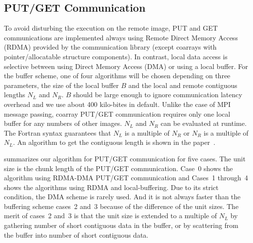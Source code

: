 \subsection{PUT/GET Communication}\label{sec:putget}

To avoid disturbing the execution on the remote image, PUT and GET communications
are implemented always using Remote Direct Memory Access (RDMA) provided by 
the communication library (except coarrays with pointer/allocatable structure components). 
In contrast, local data access is selective between using Direct Memory Access (DMA) or
using a local buffer. For the buffer scheme, one of four algorithms will be chosen 
depending on three parameters, the size of the local buffer $B$ and the 
local and remote contiguous lengths $N_L$ and $N_R$.
$B$ should be large enough to ignore communication latency overhead and we use
about 400 kilo-bites in default. Unlike the case of MPI message passing,
coarray PUT/GET communication requires only one local buffer for any numbers of
other images.
$N_L$ and $N_R$ can be evaluated at runtime. The Fortran syntax guarantees 
that $N_L$ is a multiple of $N_R$ or $N_R$ is a multiple of $N_L$.
An algorithm to get the contiguous length is shown in the paper~\cite{pgas15}.

 summarizes our algorithm for PUT/GET communication for five cases.
The unit size is the chunk length of the PUT/GET communication.
Case~0 shows the algorithm using RDMA-DMA PUT/GET communication and Cases~1 through~4
shows the algorithms using RDMA and local-buffering. 
Due to its strict condition, the DMA scheme is rarely used.
And it is not always faster than the buffering scheme cases~2 and~3 because of the 
difference of the unit sizes. The merit of cases~2 and~3 is that the unit size 
is extended to a multiple of $N_L$ by gathering number of short contiguous data in the buffer,
or by scattering from the buffer into number of short contiguous data.


